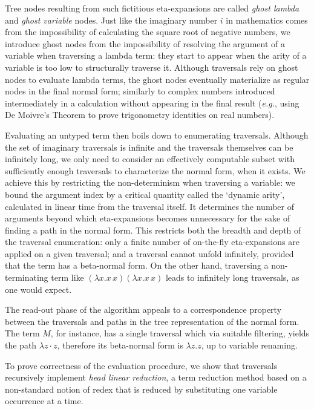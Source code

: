\documentclass{elsarticle}
\makeatletter
\theoremstyle{plain}
\theoremstyle{definition}
\renewcommand\eg{{\it e.g.\@\xspace}}
\makeatother
\begin{document}
Tree nodes resulting from such fictitious eta-expansions
are called  \emph{ghost lambda} and \emph{ghost variable} nodes.
Just like the imaginary number $i$ in mathematics comes from the impossibility of calculating the square root of negative numbers, we introduce ghost nodes from the impossibility of resolving the argument of a variable when traversing a lambda term: they start to appear when the arity of a variable is too low to structurally traverse it.
Although traversals rely on ghost nodes to evaluate lambda terms, the ghost nodes eventually materialize as regular nodes in the final normal form;
similarly to complex numbers introduced intermediately in a calculation without appearing in the final result (\eg, using De Moivre's Theorem to prove trigonometry identities on real numbers).

Evaluating an untyped term then boils down to enumerating traversals.
 Although the set of imaginary traversals is infinite and the traversals  themselves can be infinitely long, we only need to consider an effectively computable subset with sufficiently enough traversals to characterize the normal form, when it exists.
We achieve this by restricting the non-determinism when traversing a variable: we bound the argument index by a critical quantity called the `dynamic arity', calculated in linear time from the traversal itself. It determines the number of arguments beyond which eta-expansions becomes unnecessary for the sake of finding a path in the normal form. This restricts both the breadth and depth of the traversal enumeration: only a finite number of on-the-fly eta-expansions are applied on a given traversal; and a traversal cannot unfold infinitely, provided that the term has a beta-normal form.
On the other hand, traversing a non-terminating term like $(\lambda x. x\,x)(\lambda x. x\,x)$ leads to infinitely long traversals, as one would expect.

The read-out phase of the algorithm appeals to a correspondence property between the traversals and paths in the tree representation of the normal form. The term $M$, for instance, has a single traversal which via suitable filtering, yields the path $\lambda z \cdot z$, therefore its beta-normal form is $\lambda z. z$, up to variable renaming.

 To prove correctness of the evaluation procedure, we show that traversals recursively implement \emph{head linear reduction}, a term reduction method
 based on a non-standard notion of redex that is reduced
 by substituting one variable occurrence at a time.
\end{document}
